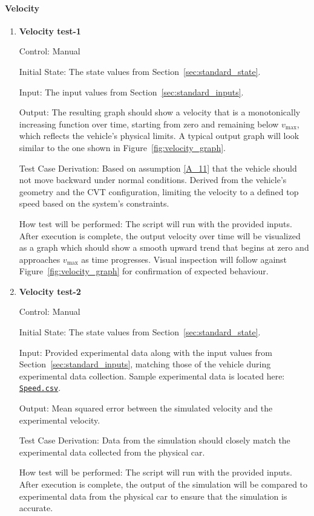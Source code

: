 \documentclass[12pt, titlepage]{article}
\newcommand{\refdata}[2]{
  \href{https://github.com/gr812b/CVT-Simulator/blob/main/experimental-data/#1
  }{\texttt{#2}}}
\begin{document}
\paragraph{Velocity}

\begin{enumerate}

  \item {} \hypertarget{Velocity test-1}{\textbf{Velocity test-1}} \label{Velocity test-1}

Control: Manual
					
Initial State: The state values from Section~\ref{sec:standard_state}.

Input: The input values from Section~\ref{sec:standard_inputs}.
					
Output: The resulting graph should show a velocity that is a monotonically increasing function over time, starting from zero and remaining below $v_\text{max}$, which reflects the vehicle’s physical limits. A typical output graph will look similar to the one shown in Figure~\ref{fig:velocity_graph}.

Test Case Derivation: Based on assumption \ref{A_11} that the vehicle should not move backward under normal conditions.
Derived from the vehicle’s geometry and the CVT configuration, limiting the velocity to a defined top speed based on the system’s constraints.


How test will be performed: The script will run with the provided inputs. After execution is complete, the output velocity over time will be visualized as a graph which should show a smooth upward trend that begins at zero and approaches $v_\text{max}$ as time progresses. Visual inspection will follow against Figure~\ref{fig:velocity_graph} for confirmation of expected behaviour.
					
\item {} \hypertarget{Velocity test-2}{\textbf{Velocity test-2}} \label{Velocity test-2}

Control: Manual

Initial State: The state values from Section~\ref{sec:standard_state}.

Input: Provided experimental data along with the input values from Section~\ref{sec:standard_inputs}, matching those of the vehicle during experimental data collection. Sample experimental data is located here: \refdata{GPS\%20SPEED.csv}{Speed.csv}.

Output: Mean squared error between the simulated velocity and the experimental velocity.

Test Case Derivation: Data from the simulation should closely match the experimental data collected from the physical car.

How test will be performed: The script will run with the provided inputs. After execution is complete, the output of the simulation will be compared to experimental data from the physical car to ensure that the simulation is accurate.

\end{enumerate}
\end{document}
